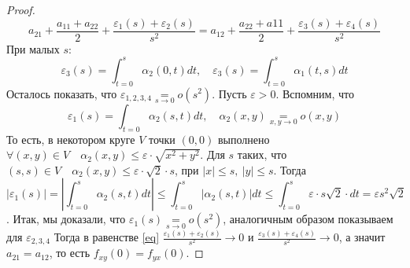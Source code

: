 \begin{theorem}
\begin{proof}
        \begin{equation}
            \label{eq}
            a_{21} + \frac{a_{11} + a_{22}}{2} + \frac{\varepsilon_1(s) + \varepsilon_2(s)}{s^2} = a_{12} + \frac{a_{22} + a{11}}{2} + \frac{\varepsilon_3(s) + \varepsilon_4(s)}{s^2}
        \end{equation}
        При малых $s$:
        \[\varepsilon_3(s) = \int_{t=0}^{s}\alpha_2(0, t)dt, \quad \varepsilon_3(s) = \int_{t=0}^{s}\alpha_1(t,s)dt\]
        Осталось показать, что $\varepsilon_{1,2,3,4} \underset{s \to 0}{=} o(s^2)$.
        Пусть $\varepsilon > 0$. Вспомним, что 
        \[\varepsilon_1(s) = \int_{t = 0}^{}\alpha_2(s,t)dt, \quad \alpha_2(x,y) \underset{x,y \to 0}{=} o(x,y)\]
        То есть, в некотором круге $V$ точки $(0,0)$ выполнено $\forall (x,y) \in V \quad \alpha_2(x,y) \leq \varepsilon \cdot \sqrt{x^2 + y^2}$.
        Для $s$ таких, что $(s,s) \in V \quad \alpha_2(x,y) \leq \varepsilon \cdot \sqrt{2} \cdot s$, при $\left| x \right| \leq s, \ \left| y \right| \leq s$.
        Тогда 
        \[\left| \varepsilon_1(s)\right| = \left| \int_{t=0}^{s}\alpha_2(s,t)dt \right| \leq \int_{t=0}^{s} \left|\alpha_2(s,t)\right|dt 
        \leq \int_{t=0}^{s}\varepsilon\cdot s\sqrt{2}\cdot dt = \varepsilon s^2\sqrt{2}\].
        Итак, мы доказали, что $\varepsilon_1(s) \underset{s \to 0}{=} o(s^2)$, аналогичным образом показываем для $\varepsilon_{2,3,4}$
        Тогда в равенстве \ref{eq} $\frac{\varepsilon_1(s) + \varepsilon_2(s)}{s^2} \to 0$ и $\frac{\varepsilon_3(s) + \varepsilon_4(s)}{s^2} \to 0$, а значит $a_{21} = a_{12}$,
        то есть $f_{xy}(0) = f_{yx}(0)$.
    \end{proof}
\end{theorem}


